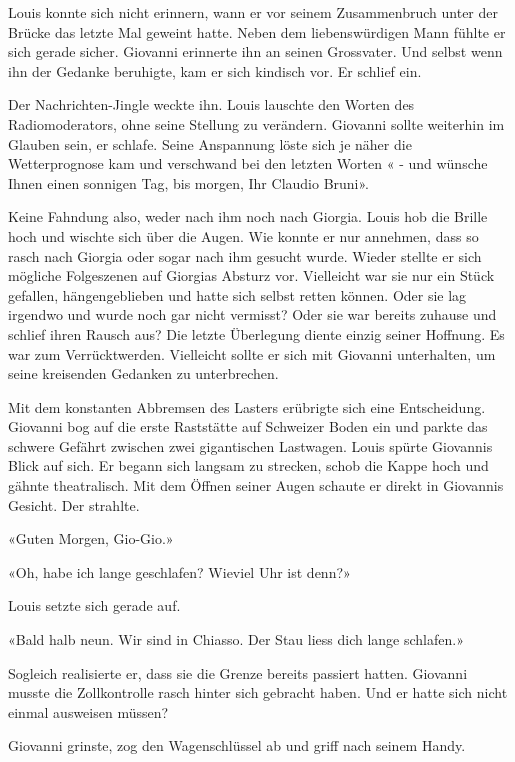 \sectionbreak

Louis konnte sich nicht erinnern, wann er vor seinem Zusammenbruch unter
der Brücke das letzte Mal geweint hatte. Neben dem liebenswürdigen Mann fühlte er sich gerade sicher.
Giovanni erinnerte ihn an seinen Grossvater. Und selbst wenn ihn der Gedanke beruhigte, kam er sich kindisch vor. Er schlief ein.

Der Nachrichten-Jingle weckte ihn. Louis lauschte den Worten
des Radiomoderators, ohne seine Stellung zu verändern. Giovanni sollte
weiterhin im Glauben sein, er schlafe. Seine Anspannung löste sich je
näher die Wetterprognose kam und verschwand bei den letzten Worten
« - und wünsche Ihnen einen sonnigen Tag, bis morgen, Ihr Claudio
Bruni».

Keine Fahndung also, weder nach ihm noch nach Giorgia.
Louis hob die Brille hoch und wischte sich über die Augen. Wie konnte er
nur annehmen, dass so rasch nach Giorgia oder sogar nach ihm gesucht
wurde. Wieder stellte er sich mögliche Folgeszenen auf Giorgias Absturz vor.
Vielleicht war sie nur ein Stück gefallen, hängengeblieben und hatte
sich selbst retten können. Oder sie lag irgendwo und wurde noch gar nicht vermisst?
Oder sie war bereits zuhause und schlief ihren Rausch aus? 
Die letzte Überlegung diente einzig seiner Hoffnung. Es war zum Verrücktwerden. Vielleicht sollte er sich mit Giovanni
unterhalten, um seine kreisenden Gedanken zu unterbrechen.

Mit dem konstanten Abbremsen des Lasters erübrigte sich eine
Entscheidung. Giovanni bog auf die erste Raststätte auf Schweizer Boden ein und parkte das schwere
Gefährt zwischen zwei gigantischen Lastwagen. Louis spürte Giovannis Blick auf sich. Er begann sich
langsam zu strecken, schob die Kappe hoch und gähnte theatralisch. Mit
dem Öffnen seiner Augen schaute er direkt in Giovannis Gesicht. Der
strahlte.

«Guten Morgen, Gio-Gio.»

«Oh, habe ich lange geschlafen? Wieviel Uhr ist denn?»

Louis setzte sich gerade auf.

«Bald halb neun. Wir sind in Chiasso. Der Stau liess dich lange schlafen.»

Sogleich realisierte er, dass sie die Grenze bereits passiert hatten.
Giovanni musste die Zollkontrolle rasch hinter sich gebracht haben. Und
er hatte sich nicht einmal ausweisen müssen?

Giovanni grinste, zog den Wagenschlüssel ab und griff nach seinem Handy. 

